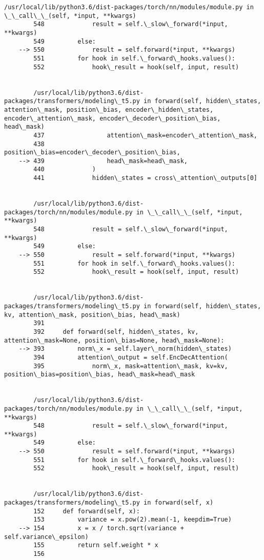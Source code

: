 \documentclass[10pt]{article}
\begin{document}
\begin{Verbatim}[commandchars=\\\{\}]
        /usr/local/lib/python3.6/dist-packages/torch/nn/modules/module.py in \_\_call\_\_(self, *input, **kwargs)
        548             result = self.\_slow\_forward(*input, **kwargs)
        549         else:
    --> 550             result = self.forward(*input, **kwargs)
        551         for hook in self.\_forward\_hooks.values():
        552             hook\_result = hook(self, input, result)


        /usr/local/lib/python3.6/dist-packages/transformers/modeling\_t5.py in forward(self, hidden\_states, attention\_mask, position\_bias, encoder\_hidden\_states, encoder\_attention\_mask, encoder\_decoder\_position\_bias, head\_mask)
        437                 attention\_mask=encoder\_attention\_mask,
        438                 position\_bias=encoder\_decoder\_position\_bias,
    --> 439                 head\_mask=head\_mask,
        440             )
        441             hidden\_states = cross\_attention\_outputs[0]


        /usr/local/lib/python3.6/dist-packages/torch/nn/modules/module.py in \_\_call\_\_(self, *input, **kwargs)
        548             result = self.\_slow\_forward(*input, **kwargs)
        549         else:
    --> 550             result = self.forward(*input, **kwargs)
        551         for hook in self.\_forward\_hooks.values():
        552             hook\_result = hook(self, input, result)


        /usr/local/lib/python3.6/dist-packages/transformers/modeling\_t5.py in forward(self, hidden\_states, kv, attention\_mask, position\_bias, head\_mask)
        391 
        392     def forward(self, hidden\_states, kv, attention\_mask=None, position\_bias=None, head\_mask=None):
    --> 393         norm\_x = self.layer\_norm(hidden\_states)
        394         attention\_output = self.EncDecAttention(
        395             norm\_x, mask=attention\_mask, kv=kv, position\_bias=position\_bias, head\_mask=head\_mask


        /usr/local/lib/python3.6/dist-packages/torch/nn/modules/module.py in \_\_call\_\_(self, *input, **kwargs)
        548             result = self.\_slow\_forward(*input, **kwargs)
        549         else:
    --> 550             result = self.forward(*input, **kwargs)
        551         for hook in self.\_forward\_hooks.values():
        552             hook\_result = hook(self, input, result)


        /usr/local/lib/python3.6/dist-packages/transformers/modeling\_t5.py in forward(self, x)
        152     def forward(self, x):
        153         variance = x.pow(2).mean(-1, keepdim=True)
    --> 154         x = x / torch.sqrt(variance + self.variance\_epsilon)
        155         return self.weight * x
        156 



\end{Verbatim}
\end{document}
